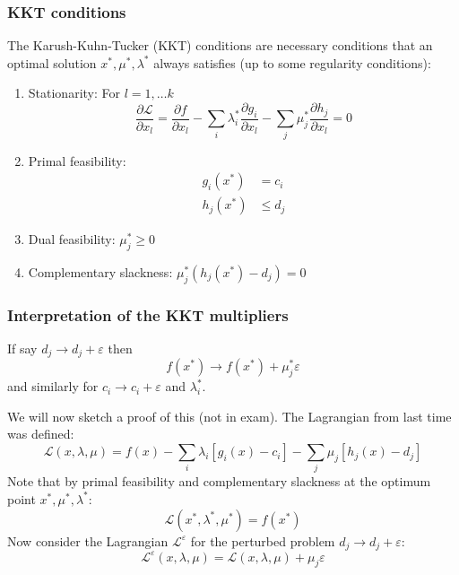\documentclass[10pt,aspectratio=169,dvipsnames]{beamer}
\def\l{\lambda}
\def\m{\mu}
\def\d{\partial}
\def\cL{\mathcal{L}}
\let\olditem\item
\renewcommand{\item}{%
\olditem\vspace{5pt}}
\begin{document}
\begin{frame}
  \frametitle{KKT conditions}

The \alert{Karush-Kuhn-Tucker (KKT) conditions} are necessary conditions that an optimal solution $x^*,\m^*,\l^*$ always satisfies (up to some regularity conditions):
\begin{enumerate}
\item \alert{Stationarity}: For $l = 1,\dots k$
  \begin{equation*}
  \frac{\d \cL}{\d x_l} =   \frac{\d f}{\d x_l} - \sum_i \l_i^* \frac{\d g_i}{\d x_l}  - \sum_j \m_j^* \frac{\d h_j}{\d x_l} = 0
  \end{equation*}
    \item \alert{Primal feasibility}:
      \begin{align*}
        g_i(x^*) & = c_i \\
        h_j(x^*) &\leq d_j
      \end{align*}
    \item \alert{Dual feasibility}: $\m_j^* \geq 0$
    \item \alert{Complementary slackness}: $\m_j^* (h_j(x^*) - d_j) = 0$
\end{enumerate}

\end{frame}


\begin{frame}
  \frametitle{Interpretation of the KKT multipliers}

  If say $d_j \to d_j + \varepsilon$ then
  \begin{equation*}
     f(x^*) \to f(x^*) + \mu^*_j \varepsilon
  \end{equation*}
  and similarly for $c_i \to c_i + \varepsilon$ and $\l^*_i$.

  We will now sketch a proof of this (not in exam). The Lagrangian from last time was defined:
\begin{equation*}
   \cL(x,\l,\m) = f(x) - \sum_i \l_i \left[g_i(x) - c_i\right]  - \sum_j \m_j \left[h_j(x) - d_j\right]
\end{equation*}
Note that by primal feasibility and complementary slackness at the optimum point $x^*,\m^*,\l^*$:
\begin{equation*}
   \cL(x^*,\l^*,\m^*) = f(x^*)
\end{equation*}
Now consider the Lagrangian $\cL^\varepsilon$ for the perturbed problem $d_j \to d_j + \varepsilon$:
\begin{equation*}
  \cL^\varepsilon(x,\l,\m) = \cL(x,\l,\m) + \m_j\varepsilon
\end{equation*}


\end{frame}
\end{document}
